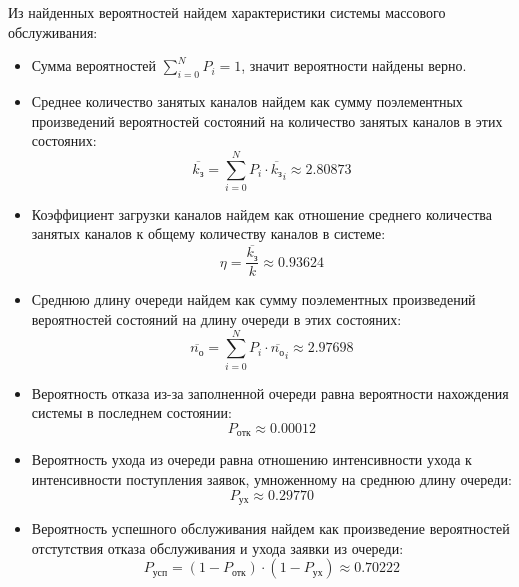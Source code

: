 Из найденных вероятностей найдем характеристики системы массового обслуживания:
\begin{itemize}
	\item Сумма вероятностей $\sum\limits_{i=0}^{N} P_i = 1$, значит вероятности найдены верно.
	
	\item Среднее количество занятых каналов найдем как сумму поэлементных произведений вероятностей состояний на количество занятых каналов в этих состояних: 
	\begin{displaymath}
		\overline{k_\text{з}} = \sum \limits_{i=0}^{N} P_i \cdot \overline{k_\text{з}}_i \approx 2.80873
	\end{displaymath}
	
	\item Коэффициент загрузки каналов найдем как отношение среднего количества занятых каналов к общему количеству каналов в системе:
	\begin{displaymath}
		\eta = \dfrac{\overline{k_\text{з}}}{k} \approx 0.93624
	\end{displaymath}
	
	\item Среднюю длину очереди найдем как сумму поэлементных произведений вероятностей состояний на длину очереди в этих состояних: 
	\begin{displaymath}
		\overline{n_\text{о}} = \sum \limits_{i=0}^{N} P_i \cdot \overline{n_\text{о}}_i \approx 2.97698
	\end{displaymath}
	
	\item Вероятность отказа из-за заполненной очереди равна вероятности нахождения системы в последнем состоянии: 
	\begin{displaymath}
		P_\text{отк} \approx 0.00012
	\end{displaymath}
	
	\item Вероятность ухода из очереди равна отношению интенсивности ухода к интенсивности поступления заявок, умноженному на среднюю длину очереди: 
	\begin{displaymath}
		P_\text{ух} \approx 0.29770
	\end{displaymath}
	
	\item Вероятность успешного обслуживания найдем как произведение вероятностей отстутствия отказа обслуживания и ухода заявки из очереди: 
	\begin{displaymath}
		P_\text{усп} = (1 - P_\text{отк}) \cdot (1 - P_\text{ух}) \approx 0.70222
	\end{displaymath}
	

\end{itemize}
